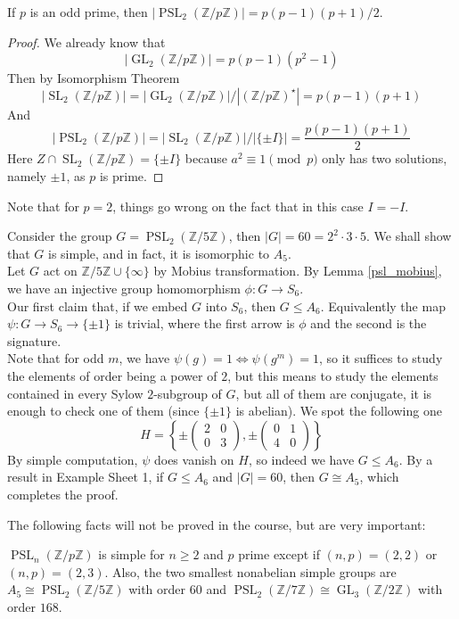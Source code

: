 \begin{lemma}
    If $p$ is an odd prime, then $|\operatorname{PSL}_2(\mathbb Z/p\mathbb Z)|=p(p-1)(p+1)/2$.
\end{lemma}
\begin{proof}
    We already know that
    $$|\operatorname{GL}_2(\mathbb Z/p\mathbb Z)|=p(p-1)(p^2-1)$$
    Then by Isomorphism Theorem
    $$|\operatorname{SL}_2(\mathbb Z/p\mathbb Z)|=|\operatorname{GL}_2(\mathbb Z/p\mathbb Z)|/|(\mathbb Z/p\mathbb Z)^\star|=p(p-1)(p+1)$$
    And
    $$|\operatorname{PSL}_2(\mathbb Z/p\mathbb Z)|=|\operatorname{SL}_2(\mathbb Z/p\mathbb Z)|/|\{\pm I\}|=\frac{p(p-1)(p+1)}{2}$$
    Here $Z\cap\operatorname{SL}_2(\mathbb Z/p\mathbb Z)=\{\pm I\}$ because $a^2\equiv 1\pmod{p}$ only has two solutions, namely $\pm 1$, as $p$ is prime.
\end{proof}
Note that for $p=2$, things go wrong on the fact that in this case $I=-I$.
\begin{example}
    Consider the group $G=\operatorname{PSL}_2(\mathbb Z/5\mathbb Z)$, then $|G|=60=2^2\cdot3\cdot5$.
    We shall show that $G$ is simple, and in fact, it is isomorphic to $A_5$.\\
    Let $G$ act on $\mathbb Z/5\mathbb Z\cup\{\infty\}$ by Mobius transformation.
    By Lemma \ref{psl_mobius}, we have an injective group homomorphism $\phi:G\to S_6$.\\
    Our first claim that, if we embed $G$ into $S_6$, then $G\le A_6$.
    Equivalently the map $\psi: G\to S_6\to \{\pm 1\}$ is trivial, where the first arrow is $\phi$ and the second is the signature.\\
    Note that for odd $m$, we have $\psi(g)=1\iff\psi(g^m)=1$, so it suffices to study the elements of order being a power of $2$, but this means to study the elements contained in every Sylow $2$-subgroup of $G$, but all of them are conjugate, it is enough to check one of them (since $\{\pm 1\}$ is abelian).
    We spot the following one
    $$H=\left\{\pm\begin{pmatrix}
        2&0\\
        0&3
    \end{pmatrix},
    \pm\begin{pmatrix}
        0&1\\
        4&0
    \end{pmatrix}\right\}$$
    By simple computation, $\psi$ does vanish on $H$, so indeed we have $G\le A_6$.
    By a result in Example Sheet 1, if $G\le A_6$ and $|G|=60$, then $G\cong A_5$, which completes the proof.
\end{example}
The following facts will not be proved in the course, but are very important:
\begin{proposition}
    $\operatorname{PSL}_n(\mathbb Z/p\mathbb Z)$ is simple for $n\ge 2$ and $p$ prime except if $(n,p)=(2,2)$ or $(n,p)=(2,3)$.
    Also, the two smallest nonabelian simple groups are $A_5\cong\operatorname{PSL}_2(\mathbb Z/5\mathbb Z)$ with order $60$ and $\operatorname{PSL}_2(\mathbb Z/7\mathbb Z)\cong\operatorname{GL}_3(\mathbb Z/2\mathbb Z)$ with order $168$.
\end{proposition}